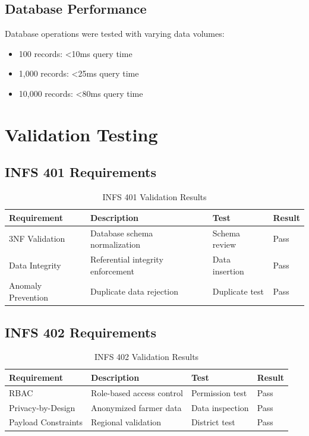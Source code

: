 \begin{enumerate}
\subsection{Database Performance}

Database operations were tested with varying data volumes:

\begin{itemize}
    \item 100 records: <10ms query time
    \item 1,000 records: <25ms query time
    \item 10,000 records: <80ms query time
\end{itemize}

\section{Validation Testing}

\subsection{INFS 401 Requirements}

\begin{table}[H]
\centering
\begin{tabular}{|l|l|l|l|}
\hline
\textbf{Requirement} & \textbf{Description} & \textbf{Test} & \textbf{Result} \\
\hline
3NF Validation & Database schema normalization & Schema review & Pass \\
Data Integrity & Referential integrity enforcement & Data insertion & Pass \\
Anomaly Prevention & Duplicate data rejection & Duplicate test & Pass \\
\hline
\end{tabular}
\caption{INFS 401 Validation Results}
\end{table}

\subsection{INFS 402 Requirements}

\begin{table}[H]
\centering
\begin{tabular}{|l|l|l|l|}
\hline
\textbf{Requirement} & \textbf{Description} & \textbf{Test} & \textbf{Result} \\
\hline
RBAC & Role-based access control & Permission test & Pass \\
Privacy-by-Design & Anonymized farmer data & Data inspection & Pass \\
Payload Constraints & Regional validation & District test & Pass \\
\hline
\end{tabular}
\caption{INFS 402 Validation Results}
\end{table}


\end{enumerate}
